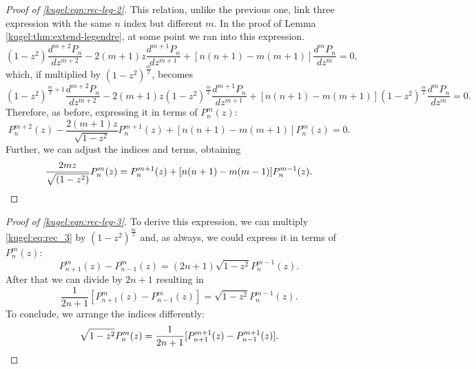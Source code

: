 \begin{proof}[Proof of \eqref{kugel:eqn:rec-leg-2}]
  This relation, unlike the previous one, link three expression with the same
  $n$ index but different $m$. In the proof of Lemma
  \ref{kugel:thm:extend-legendre}, at some point we ran into this expression.
  \begin{equation*}
    (1-z^2)\frac{d^{m+2}P_n}{dz^{m+2}}
    - 2(m+1)z \frac{d^{m+1}P_n}{dz^{m+1}}
    + [n(n+1)-m(m+1)]\frac{d^mP_n}{dz^m} = 0,
  \end{equation*}
  which, if multiplied by $(1-z^2)^{\frac{m}{2}}$, becomes
  \begin{equation*}
    (1-z^2)^{\frac{m}{2}+1}\frac{d^{m+2}P_n}{dz^{m+2}}
    - 2(m+1)z (1-z^2)^{\frac{m}{2}}\frac{d^{m+1}P_n}{dz^{m+1}}
    + [n(n+1)-m(m+1)](1-z^2)^{\frac{m}{2}}\frac{d^mP_n}{dz^m} = 0.
  \end{equation*}
  Therefore, as before, expressing it in terms of $P^m_n(z)$:
  \begin{equation*}
    P^{m+2}_n(z) - \frac{2(m+1)z}{\sqrt{1-z^2}}P^{m+1}_n(z)
    + [n(n+1)-m(m+1)]P^m_n(z)=0.
  \end{equation*}
  Further, we can adjust the indices and terms, obtaining
  \begin{equation*}
    \frac{2mz}{\sqrt{(1-z^2)}} P^m_n(z)
    = P^{m+1}_n(z) + [n(n+1)-m(m-1)] P^{m-1}_n(z).
    \qedhere
  \end{equation*}
\end{proof}

\begin{proof}[Proof of \eqref{kugel:eqn:rec-leg-3}]
  To derive this expression, we can multiply \eqref{kugel:eq:rec_3} by
  $(1-z^2)^{\frac{m}{2}}$ and, as always, we could express it in terms of
  $P^m_n(z)$:
  \begin{equation*}
    P^m_{n+1}(z) - P^m_{n-1}(z) = (2n+1)\sqrt{1-z^2}P^{m-1}_n(z).
  \end{equation*}
  After that we can divide by $2n+1$ resulting in
  \begin{equation}\label{kugel:eq:helper}
    \frac{1}{2n+1}[P^m_{n+1}(z) - P^m_{n-1}(z)] = \sqrt{1-z^2}P^{m-1}_n(z).
  \end{equation}
  To conclude, we arrange the indices differently:
  \begin{equation*}
    \sqrt{1-z^2}P^{m}_n(z)=\frac{1}{2n+1}[P^{m+1}_{n+1}(z) - P^{m+1}_{n-1}(z)].
    \qedhere
  \end{equation*}
\end{proof}

